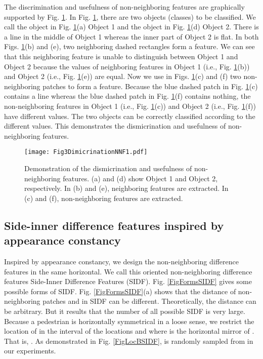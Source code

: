 \documentclass[10pt,twocolumn,letterpaper]{article}
\begin{document}
The discrimination and usefulness of non-neighboring features are 
graphically supported by Fig. \ref{FigDimicrinationNNF}. In Fig. \ref{FigDimicrinationNNF}, there are two objects (classes) 
to be classified. We call the object in Fig. \ref{FigDimicrinationNNF}(a) Object 1 and the object in 
Fig. \ref{FigDimicrinationNNF}(d) Object 2. There is a line 
in the middle of Object 1 whereas the inner part of Object 2 is flat. In both Figs. \ref{FigDimicrinationNNF}(b) and (e), two neighboring 
dashed rectangles form a feature. We can see that this neighboring feature 
is unable to distinguish between Object 1 and Object 2 because the values of 
neighboring features in Object 1 (i.e., Fig. \ref{FigDimicrinationNNF}(b)) and Object 2 (i.e., Fig. 
\ref{FigDimicrinationNNF}(e)) are equal. Now we use in Figs. \ref{FigDimicrinationNNF}(c) and (f) two non-neighboring 
patches to form a feature. Because the blue dashed patch in Fig. \ref{FigDimicrinationNNF}(c) 
contains a line whereas the blue dashed patch in Fig. \ref{FigDimicrinationNNF}(f) contains 
nothing, the non-neighboring features in Object 1 (i.e., Fig. \ref{FigDimicrinationNNF}(c)) and 
Object 2 (i.e., Fig. \ref{FigDimicrinationNNF}(f)) have different values. The two objects can be 
correctly classified according to the different values. This demonstrates 
the dismicrination and usefulness of non-neighboring features. 

\begin{figure}[!t]
\centering
\texttt{[image: Fig3DimicrinationNNF1.pdf]}
\caption{Demonstration of the dismicrination and usefulness of non-neighboring features. (a) and (d) show Object 1 and Object 2, respectively. In (b) and (e), neighboring features are extracted. In (c) and (f), non-neighboring features are extracted.}
\label{FigDimicrinationNNF}
\end{figure}

\subsection{Side-inner difference features inspired by appearance constancy}
Inspired by appearance constancy, we design the non-neighboring difference 
features in the same horizontal. We call this oriented non-neighboring 
difference features Side-Inner Difference Features (SIDF). Fig. \ref{FigFormsSIDF} gives some 
possible forms of SIDF. Fig. \ref{FigFormsSIDF}(a) shows that the distance  of non-neighboring patches  and  in SIDF can be 
different. Theoretically, the distance can be arbitrary. But it results that the number of all possible SIDF is very large. Because a pedestrian is 
horizontally symmetrical in a loose sense, we restrict the location 
 of  in the interval of the locations  and  where  is 
the horizontal mirror of . That is, . As 
demonstrated in Fig. \ref{FigLocBSIDF},  is randomly sampled from  in our experiments. 
\end{document}
